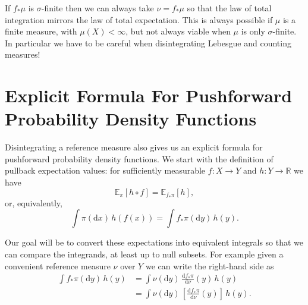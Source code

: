 \documentclass[11pt, oneside]{article}
\newcommand{\E}[2]{
  \ensuremath{ \mathbb{E}_{#1} \! \left[ #2 \right] }
}
\newcommand{\rnd}[2]{
  \ensuremath{ \frac{ \mathrm{d} #1}{ \mathrm{d} #2 } }
}
\begin{document}
If $f_{*} \mu$ is $\sigma$-finite then we can always take $\nu = f_{*} \mu$ so that 
the law of total integration mirrors the law of total expectation.  This is always 
possible if $\mu$ is a finite measure, with $\mu(X) < \infty$, but not always
viable when $\mu$ is only $\sigma$-finite.  In particular we have to be careful 
when disintegrating Lebesgue and counting measures!



\section{Explicit Formula For Pushforward Probability Density Functions}

Disintegrating a reference measure also gives us an explicit formula for pushforward 
probability density functions.  We start with the definition of pullback expectation values:
for sufficiently measurable $f : X \rightarrow Y$ and $h : Y \rightarrow \mathbb{R}$ we have
%
\begin{equation*}
\E{\pi}{ h \circ f } = \E{f_{*} \pi}{ h },
\end{equation*}
%
or, equivalently,
%
\begin{equation*}
\int \pi( \mathrm{d} x ) \, h(f(x)) = \int f_{*} \pi( \mathrm{d} y )  \, h(y).
\end{equation*}

Our goal will be to convert these expectations into equivalent integrals so that we can 
compare the integrands, at least up to null subsets.  For example given a convenient 
reference measure $\nu$ over $Y$ we can write the right-hand side as
%
\begin{align*}
\int f_{*} \pi( \mathrm{d} y )  \, h(y)
&=
\int \nu( \mathrm{d} y ) \, \rnd{f_{*}\pi}{\nu}(y) \, h(y)
\\
&=
\int \nu( \mathrm{d} y ) \, \left[ \rnd{f_{*}\pi}{\nu}(y) \right] \, h(y).
\end{align*}
\end{document}
